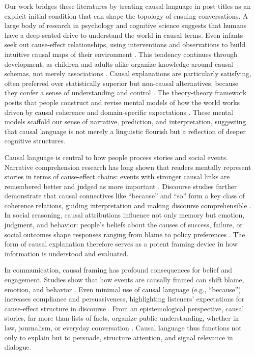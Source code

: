\documentclass[acmsmall]{acmart}
\begin{document}
Our work bridges these literatures by treating causal language in post titles as an explicit initial condition that can shape the topology of ensuing conversations. A large body of research in psychology and cognitive science suggests that humans have a deep-seated drive to understand the world in causal terms. Even infants seek out cause-effect relationships, using interventions and observations to build intuitive causal maps of their environment \cite{gopnik2004theory,gopnik2007causal}. This tendency continues through development, as children and adults alike organize knowledge around causal schemas, not merely associations \cite{keil2006explanation,sloman2009causal}. Causal explanations are particularly satisfying, often preferred over statistically superior but non-causal alternatives, because they confer a sense of understanding and control \cite{lombrozo2006structure}. The theory-theory framework posits that people construct and revise mental models of how the world works driven by causal coherence and domain-specific expectations \cite{gopnik2012reconstructing}. These mental models scaffold our sense of narrative, prediction, and interpretation, suggesting that causal language is not merely a linguistic flourish but a reflection of deeper cognitive structures.


Causal language is central to how people process stories and social events. Narrative comprehension research has long shown that readers mentally represent stories in terms of cause-effect chains: events with stronger causal links are remembered better and judged as more important \cite{graesser1994constructing}. Discourse studies further demonstrate that causal connectives like ``because'' and ``so'' form a key class of coherence relations, guiding interpretation and making discourse comprehensible \cite{sanders1992toward}. In social reasoning, causal attributions influence not only memory but emotion, judgment, and behavior: people’s beliefs about the causes of success, failure, or social outcomes shape responses ranging from blame to policy preferences \cite{weiner1985attributional,iyengar1987television}. The form of causal explanation therefore serves as a potent framing device in how information is understood and evaluated.









In communication, causal framing has profound consequences for belief and engagement. Studies show that how events are causally framed can shift blame, emotion, and behavior \cite{lagnado2008judgments}. Even minimal use of causal language (e.g., ``because'') increases compliance and persuasiveness, highlighting listeners’ expectations for cause-effect structure in discourse \cite{langer1978mindlessness}. From an epistemological perspective, causal stories, far more than lists of facts, organize public understanding, whether in law, journalism, or everyday conversation \cite{pennington1992explaining}. Causal language thus functions not only to explain but to persuade, structure attention, and signal relevance in dialogue.
\end{document}
